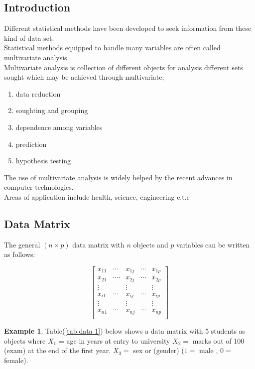 \documentclass[11pt,a4paper]{article}
\theoremstyle{definition}
\newtheorem{exa}[thm]{Example}
\begin{document}
\subsection{ Introduction}
Different statistical methods have been developed to seek information from these kind of data set.\\
Statistical methods equipped to handle many variables are often called multivariate analysis.\\

Multivariate analysis is collection of different objects  for analysis different sets sought which may be achieved through multivariate;
\begin{enumerate}
\item data reduction
\item soughting and grouping
\item dependence among variables
\item prediction
\item hypothesis testing
\end{enumerate}

The use of multivariate analysis is widely helped by the recent advances in computer technologies.\\
Areas of application include health, science, engineering e.t.c\\



\subsection{Data Matrix}
The general $(n\times p)$ data matrix with $n$ objects and $p$ variables can be written as follows:

$$
\begin{bmatrix}
x_{11} & \cdots& x_{1j} & \cdots& x_{1p}\\
x_{21} & \cdot\cdots  & x_{2j} & \cdots& x_{2p}\\
\vdots &              & \vdots &              & \vdots\\
x_{i1} & \cdots& x_{ij} & \cdots& x_{ip}\\
\vdots &              & \vdots &              & \vdots\\
x_{n1} & \cdots& x_{nj} & \cdots& x_{np}\\ 
\end{bmatrix}
$$

\begin{exa}
Table(\ref{tab:data 1}) below shows a data matrix with 5 students as objects where $X_1$ = age in years at entry to university $X_2=$ marks out of 100 (exam) at the end of the first year.  $X_3=$ sex or (gender) ($1=$ male , $0=$ female).
\end{exa}
\end{document}
